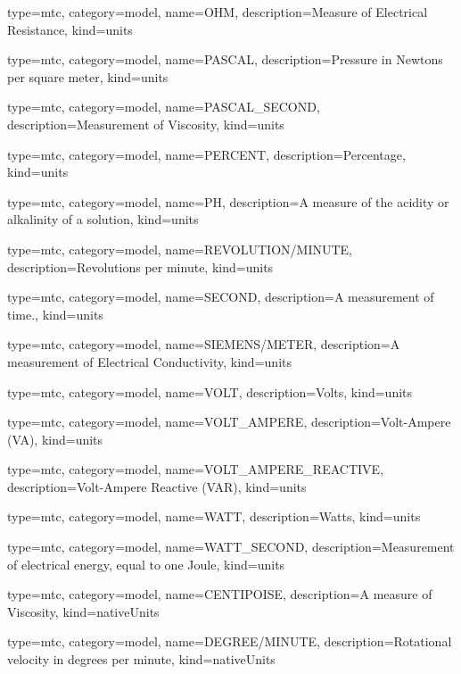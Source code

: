 {
  type=mtc,
  category=model,
  name={OHM},
  description={Measure of Electrical Resistance},
  kind={units}
}


{
  type=mtc,
  category=model,
  name={PASCAL},
  description={Pressure in Newtons per square meter},
  kind={units}
}


{
  type=mtc,
  category=model,
  name={PASCAL\_SECOND},
  description={Measurement of Viscosity},
  kind={units}
}


{
  type=mtc,
  category=model,
  name={PERCENT},
  description={Percentage},
  kind={units}
}


{
  type=mtc,
  category=model,
  name={PH},
  description={A measure of the acidity or alkalinity of a solution},
  kind={units}
}


{
  type=mtc,
  category=model,
  name={REVOLUTION/MINUTE},
  description={Revolutions per minute},
  kind={units}
}


{
  type=mtc,
  category=model,
  name={SECOND},
  description={A measurement of time.},
  kind={units}
}


{
  type=mtc,
  category=model,
  name={SIEMENS/METER},
  description={A measurement of Electrical Conductivity},
  kind={units}
}


{
  type=mtc,
  category=model,
  name={VOLT},
  description={Volts},
  kind={units}
}


{
  type=mtc,
  category=model,
  name={VOLT\_AMPERE},
  description={Volt-Ampere  (VA)},
  kind={units}
}


{
  type=mtc,
  category=model,
  name={VOLT\_AMPERE\_REACTIVE},
  description={Volt-Ampere Reactive  (VAR)},
  kind={units}
}


{
  type=mtc,
  category=model,
  name={WATT},
  description={Watts},
  kind={units}
}


{
  type=mtc,
  category=model,
  name={WATT\_SECOND},
  description={Measurement of electrical energy, equal to one Joule},
  kind={units}
}


{
  type=mtc,
  category=model,
  name={CENTIPOISE},
  description={A measure of Viscosity},
  kind={nativeUnits}
}


{
  type=mtc,
  category=model,
  name={DEGREE/MINUTE},
  description={Rotational velocity in degrees per minute},
  kind={nativeUnits}
}


